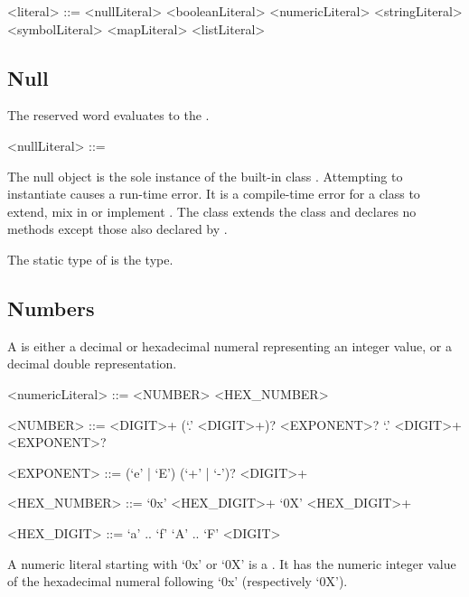 \documentclass[makeidx]{article}
\begin{document}
\begin{grammar}
<literal> ::= <nullLiteral>
  \alt <booleanLiteral>
  \alt <numericLiteral>
  \alt <stringLiteral>
  \alt <symbolLiteral>
  \alt <mapLiteral>
  \alt <listLiteral>
\end{grammar}


\subsection{Null}

\LMHash{}%
The reserved word \NULL{} evaluates to the .

\begin{grammar}
<nullLiteral> ::= \NULL{}
\end{grammar}

\LMHash{}%
The null object is the sole instance of the built-in class .
Attempting to instantiate  causes a run-time error.
It is a compile-time error for a class to extend, mix in or implement .
The  class extends the  class and declares no methods except those also declared by .

\LMHash{}%
The static type of \NULL{} is the  type.


\subsection{Numbers}

\LMHash{}%
A 
is either a decimal or hexadecimal numeral representing an integer value, or a decimal double representation.

\begin{grammar}
<numericLiteral> ::= <NUMBER>
  \alt <HEX\_NUMBER>

<NUMBER> ::= <DIGIT>+ (`.' <DIGIT>+)? <EXPONENT>?
  \alt `.' <DIGIT>+ <EXPONENT>?

<EXPONENT> ::= (`e' | `E') (`+' | `-')? <DIGIT>+

<HEX\_NUMBER> ::= `0x' <HEX\_DIGIT>+
  \alt `0X' <HEX\_DIGIT>+

<HEX\_DIGIT> ::= `a' .. `f'
  \alt `A' .. `F'
  \alt <DIGIT>
\end{grammar}

\LMHash{}%
A numeric literal starting with `0x' or `0X'
is a .
It has the numeric integer value of the hexadecimal numeral
following `0x' (respectively `0X').
\end{document}
